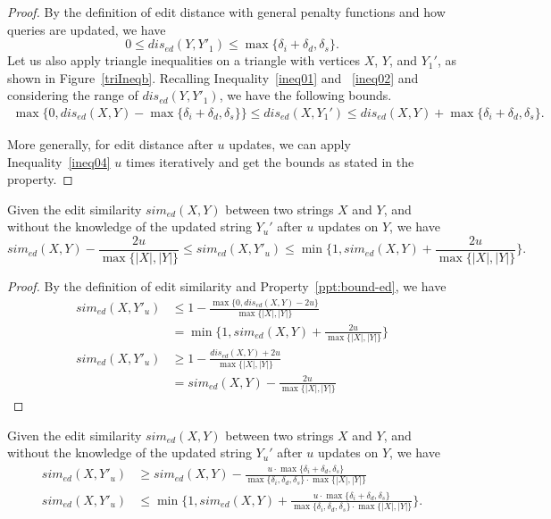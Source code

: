 \begin{proof}
By the definition of edit distance with general penalty functions and how queries are updated, we have $$0 \leq dis_{ed}(Y, Y'_1)\leq \max\{ \delta_i + \delta_d, \delta_s\}\text{.}$$ Let us also apply triangle inequalities on a triangle with vertices $X$, $Y$, and $Y_1'$, as shown in Figure~\ref{triIneqb}. Recalling Inequality~\ref{ineq01} and ~\ref{ineq02} and considering the range of $dis_{ed}(Y, Y'_1)$, we have the following bounds.     
\begin{align}\label{ineq04}
\max\{0, dis_{ed}(X, Y) - \max\{\delta_i + \delta_d, \delta_s\} \} \leq dis_{ed}(X, Y_1') \leq dis_{ed}(X, Y) + \max\{\delta_i+\delta_d, \delta_s\}\text{.}
\end{align}

More generally, for edit distance after $u$ updates, we can apply Inequality~\ref{ineq04} $u$ times iteratively and get the bounds as stated in the property.
\end{proof}


\begin{property}\label{ppt:bound-es}
Given the edit similarity $sim_{ed}(X, Y)$ between two strings $X$ and $Y$, and without the knowledge of the updated string $Y_u'$ after $u$ updates on $Y$, we have 
$$sim_{ed}(X, Y)-\frac{2u}{\max\{|X|, |Y|\}} \leq sim_{ed}(X, Y'_u) \leq \min\{1, sim_{ed}(X,Y)+\frac{2u}{\max\{|X|, |Y|\}}\}.$$
\end{property}

\begin{proof}
By the definition of edit similarity and Property~\ref{ppt:bound-ed}, we have 
\begin{align*} 
sim_{ed}(X, Y'_u) &\leq 1 - \frac{\max\{0, dis_{ed}(X, Y) - 2u\}}{\max\{|X|, |Y|\}}\\
&=\min\{1, sim_{ed}(X,Y)+\frac{2u}{\max\{|X|, |Y|\}}\}\\
sim_{ed}(X, Y'_u) &\geq 1 - \frac{dis_{ed}(X, Y) + 2u}{\max\{|X|, |Y|\}}\\
&= sim_{ed}(X, Y)-\frac{2u}{\max\{|X|, |Y|\}}
\end{align*}
\end{proof}

\begin{property}\label{ppt:bound-es-gen}
Given the edit similarity $sim_{ed}(X, Y)$ between two strings $X$ and $Y$, and without the knowledge of the updated string $Y_u'$ after $u$ updates on $Y$, we have 
\begin{align}
sim_{ed}(X, Y'_u) &\geq sim_{ed}(X, Y)-\frac{u\cdot \max\{\delta_i + \delta_d, \delta_s\}}{\max\{\delta_i, \delta_d, \delta_s\} \cdot \max\{|X|, |Y|\}}\\
sim_{ed}(X, Y'_u) &\leq \min\{1, sim_{ed}(X,Y)+\frac{u \cdot \max\{\delta_i + \delta_d, \delta_s\}}{\max\{\delta_i, \delta_d, \delta_s\} \cdot \max\{|X|, |Y|\}}\}.
\end{align}
\end{property}

